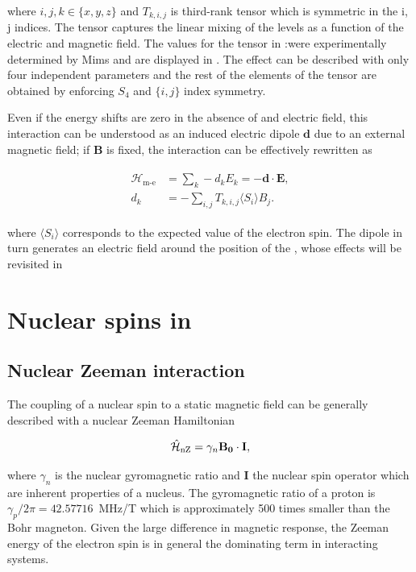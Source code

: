where $i,j,k \in\{x,y,z\}$ and $T_{k, i, j}$ is third-rank tensor which is symmetric in the {i, j} indices. The tensor captures the linear mixing of the levels as a function of the electric and magnetic field. The values for the tensor in \Er:\Ca were experimentally determined by Mims  and are displayed in . The effect can be described with only four independent parameters and the rest of the elements of the tensor are obtained by enforcing $S_4$ and $\{i, j\}$ index symmetry.

Even if the energy shifts are zero in the absence of and electric field, this interaction can be understood as an induced electric dipole $\mathbf{d}$ due to an external magnetic field; if $\mathbf{B}$ is fixed, the interaction can be effectively rewritten as 

\begin{align}
\begin{split}
    \mathcal{H}_{\text{m-e}} &= \sum_k-d_k E_k = -\mathbf{d} \cdot \mathbf{E}, \\
    d_k &= - \sum_{i,j} T_{k, i, j} \langle S_{i}\rangle B_j.
\end{split}
\label{seq:electric_dipole}
\end{align}

where $\langle S_i \rangle$ corresponds to the expected value of the electron spin. The dipole in turn generates an electric field around the position of the \Er, whose effects will be revisited in 


\section[Nuclear spins in CaWO4]{Nuclear spins in \Ca}

\subsection{Nuclear Zeeman interaction}

The coupling of a nuclear spin to a static magnetic field can be generally described with a nuclear Zeeman Hamiltonian

\begin{equation}
    \hat{\mathcal{H}}_{\text{nZ}} = \gamma_n \mathbf{B_0}\cdot\mathbf{I},
\end{equation}

\noindent where $\gamma_n$ is the nuclear gyromagnetic ratio and $\mathbf{I}$ the nuclear spin operator which are inherent properties of a nucleus. The gyromagnetic ratio of a proton is $\gamma_p/2\pi = 42.57716$~MHz/T  which is approximately 500 times smaller than the Bohr magneton. Given the large difference in magnetic response, the Zeeman energy of the electron spin is in general the dominating term in interacting systems. 

